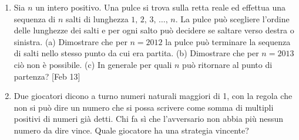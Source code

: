 \documentclass[a4paper]{article}
\newcommand{\Intitola}{\begin{center}
		\vspace*{0,5 cm}
		{\Huge \textsc{\Title}} \\
		\vspace{0,5 cm}
		\textsc{\Author} \hspace{1cm} \textsc{\Date}
		\thispagestyle{empty}
		\vspace{0,7 cm}
\end{center}}
\theoremstyle{remark}
\theoremstyle{definition}
\newcommand{\subscript}[2]{$#1  #2$}
\begin{document}
\begin{enumerate}[label=(\subscript{d}{\arabic*})]
	\item Sia $ n $ un intero positivo. Una pulce si trova sulla retta reale ed effettua una sequenza di $ n $ salti
	di lunghezza $ 1,\, 2,\, 3,\,\dots ,\,n $. La pulce può scegliere l’ordine delle lunghezze dei salti e per ogni salto
	può decidere se saltare verso destra o sinistra.
	(a) Dimostrare che per $ n = 2012 $ la pulce può terminare la sequenza di salti nello stesso punto
	da cui era partita.
	(b) Dimostrare che per $ n = 2013 $ ciò non è possibile.
	(c) In generale per quali $ n $ può ritornare al punto di partenza? [Feb 13]
	
	\item  Due giocatori dicono a turno numeri naturali maggiori di 1, con la regola che non si
	può dire un numero che si possa scrivere come somma di multipli positivi di numeri
	già detti. Chi fa sì che l’avversario non abbia più nessun numero da dire vince. Quale
	giocatore ha una strategia vincente?
\end{enumerate}

\Intitola
\normalsize
\end{document}
